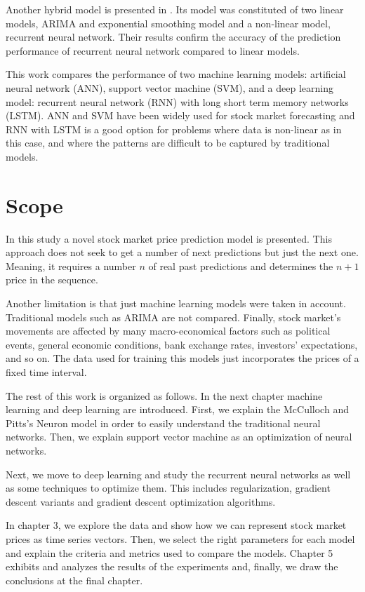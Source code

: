 Another hybrid model is presented in \cite{rather2015recurrent}. Its model was constituted of two linear models,  ARIMA and exponential smoothing model and a non-linear model, recurrent neural network. Their results confirm the accuracy of the prediction performance of recurrent neural network compared to linear models.

This work compares the performance of two machine learning models: artificial neural network (ANN), support vector machine (SVM),  and a deep learning model: recurrent neural network (RNN) with long short term memory networks (LSTM). ANN and SVM have been widely used for stock market forecasting and RNN with LSTM is a good option for problems where data is non-linear  as in this case, and where the patterns are difficult to be captured by traditional models.

\section{Scope}
In this study a novel stock market price prediction model is presented. This approach does not seek to get a number of next predictions but just the next one. Meaning, it requires a number $n$ of real past predictions and determines the $n+1$ price in the sequence. 

Another limitation is that just machine learning models were taken in account. Traditional models such as ARIMA are not compared. Finally, stock market’s movements are affected by many macro-economical factors such as political events, general economic conditions, bank exchange rates, investors’ expectations, and so on. The data used for training this models just incorporates the prices of a fixed time interval.

The rest of this work is organized as follows. In the next chapter machine learning and deep learning are introduced. First, we explain the McCulloch and Pitts's Neuron model in order to easily understand the traditional neural networks. Then, we explain support vector machine as an optimization of neural networks.

Next, we move to deep learning and study the recurrent neural networks as well as some techniques to optimize them. This includes regularization, gradient descent variants and gradient descent optimization algorithms.  

In  chapter 3, we explore the data and show how we can represent stock market prices as time series vectors. Then, we select the right parameters for each model and explain the criteria and metrics used to compare the models. Chapter 5 exhibits and analyzes  the results of the experiments and, finally, we draw the conclusions at the final chapter.


